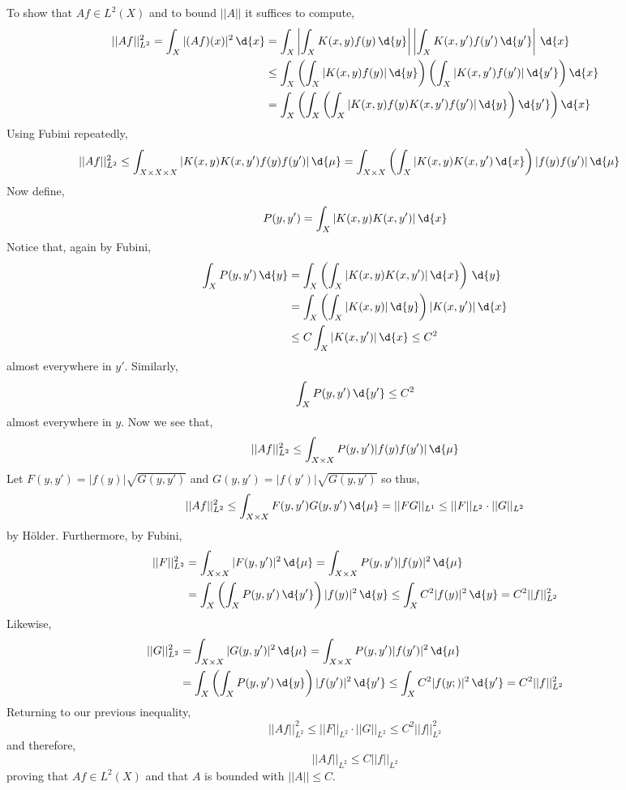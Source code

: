 \documentclass[12pt]{article}
\begin{document}
To show that $A f \in L^2(X)$ and to bound $|| A ||$ it suffices to compute,
\begin{align*}
|| A f ||_{L^2}^2 = \int_X | (A f)(x) |^2 \, \d{x} & = \int_X \left| \int_X K(x, y) f(y) \, \d{y} \right| \left| \int_X K(x, y') f(y') \, \d{y'} \right| \, \d{x}
\\
& \le \int_X \left( \int_X | K(x, y) f(y) | \, \d{y} \right) \left( \int_X | K(x, y') f(y')| \, \d{y'} \right) \d{x}
\\
& = \int_X \left( \int_X \left( \int_X | K(x, y) f(y) K(x, y') f(y')| \, \d{y} \right) \d{y'} \right) \d{x}
\end{align*}
Using Fubini repeatedly,
\begin{align*}
|| A f ||_{L^2}^2 & \le \int_{X \times X \times X} | K(x, y) K(x, y') f(y) f(y')| \, \d{\mu} = \int_{X \times X} \left( \int_X |K(x, y) K(x, y') \, \d{x} \right) |f(y) f(y')| \, \d{\mu} 
\end{align*}
Now define,
\[ P(y,y') = \int_X |K(x, y) K(x, y')| \, \d{x} \]
Notice that, again by Fubini,
\begin{align*}
\int_X P(y, y') \, \d{y} & = \int_{X} \left( \int_X |K(x, y) K(x, y')| \, \d{x} \right) \, \d{y} 
\\
& = \int_X \left( \int_X |K(x, y)|  \, \d{y} \right) |K(x, y')| \, \d{x}
\\
& \le C \int_X | K(x, y') | \, \d{x}  \le C^2
\end{align*}
almost everywhere in $y'$. Similarly,
\[ \int_X P(y, y') \, \d{y'} \le C^2 \]
almost everywhere in $y$. Now we see that,
\[ || A f ||_{L^2}^2 \le \int_{X \times X} P(y, y') |f(y) f(y')| \, \d{\mu} \]
Let $F(y, y') = |f(y)| \sqrt{G(y, y')}$ and $G(y, y') = |f(y')| \sqrt{G(y, y')}$ so thus,
\[ || A f ||_{L^2}^2 \le \int_{X \times X} F(y, y') G(y, y') \, \d{\mu} = || F G ||_{L^1} \le || F ||_{L^2} \cdot || G ||_{L^2} \]
by H\"{o}lder. Furthermore, by Fubini,
\begin{align*}
|| F ||_{L^2}^2 & = \int_{X \times X} |F(y, y')|^2 \, \d{\mu} = \int_{X \times X} P(y, y') |f(y)|^2 \, \d{\mu} 
\\
& = \int_X \left( \int_X P(y, y') \, \d{y'} \right) |f(y)|^2 \, \d{y} \le \int_X C^2 |f(y)|^2 \, \d{y} = C^2 || f ||_{L^2}^2 
\end{align*}
Likewise,
\begin{align*}
|| G ||_{L^2}^2 & = \int_{X \times X} |G(y, y')|^2 \, \d{\mu} = \int_{X \times X} P(y, y') |f(y')|^2 \, \d{\mu} 
\\
& = \int_X \left( \int_X P(y, y') \, \d{y} \right) |f(y')|^2 \, \d{y'} \le \int_X C^2 |f(y;)|^2 \, \d{y'} = C^2 || f ||_{L^2}^2 
\end{align*}
Returning to our previous inequality,
\[ || A f ||_{L^2}^2 \le || F ||_{L^2} \cdot || G ||_{L^2} \le C^2 || f ||_{L^2}^2 \]
and therefore,
\[ || A f ||_{L^2} \le C || f ||_{L^2} \]
proving that $A f \in L^2(X)$ and that $A$ is bounded with $|| A || \le C$.
\end{document}
